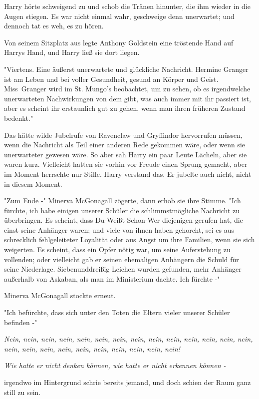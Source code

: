 {Harry hörte schweigend zu und schob die Tränen hinunter, die ihm wieder in die Augen stiegen. Es war nicht einmal wahr, geschweige denn unerwartet; und dennoch tat es weh, es zu hören.

Von seinem Sitzplatz aus legte Anthony Goldstein eine tröstende Hand auf Harrys Hand, und Harry ließ sie dort liegen.

"Viertens. Eine äußerst unerwartete und glückliche Nachricht. Hermine Granger ist am Leben und bei voller Gesundheit, gesund an Körper und Geist. Miss~Granger wird im St. Mungo's beobachtet, um zu sehen, ob es irgendwelche unerwarteten Nachwirkungen von dem gibt, was auch immer mit ihr passiert ist, aber es scheint ihr erstaunlich gut zu gehen, wenn man ihren früheren Zustand bedenkt."

Das hätte wilde Jubelrufe von Ravenclaw und Gryffindor hervorrufen müssen, wenn die Nachricht als Teil einer anderen Rede gekommen wäre, oder wenn sie unerwarteter gewesen wäre. So aber sah Harry ein paar Leute Lächeln, aber sie waren kurz. Vielleicht hatten sie vorhin vor Freude einen Sprung gemacht, aber im Moment herrschte nur Stille. Harry verstand das. Er jubelte auch nicht, nicht in diesem Moment.

"Zum Ende -" Minerva McGonagall zögerte, dann erhob sie ihre Stimme. "Ich fürchte, ich habe einigen unserer Schüler die schlimmstmögliche Nachricht zu überbringen. Es scheint, dass Du-Weißt-Schon-Wer diejenigen gerufen hat, die einst seine Anhänger waren; und viele von ihnen haben gehorcht, sei es aus schrecklich fehlgeleiteter Loyalität oder aus Angst um ihre Familien, wenn sie sich weigerten. Es scheint, dass ein Opfer nötig war, um seine Auferstehung zu vollenden; oder vielleicht gab er seinen ehemaligen Anhängern die Schuld für seine Niederlage. Siebenunddreißig Leichen wurden gefunden, mehr Anhänger außerhalb von Askaban, als man im Ministerium dachte. Ich fürchte -"

Minerva McGonagall stockte erneut.

"Ich befürchte, dass sich unter den Toten die Eltern vieler unserer Schüler befinden -"

\emph{Nein, nein, nein, nein, nein, nein, nein, nein, nein, nein, nein, nein, nein, nein, nein, nein, nein, nein, nein, nein, nein, nein, nein, nein!}

\emph{Wie hatte er nicht denken können, wie hatte er nicht erkennen können -}

irgendwo im Hintergrund schrie bereits jemand, und doch schien der Raum ganz still zu sein.

}
